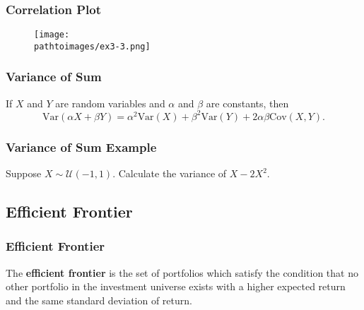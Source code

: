 \documentclass{beamer}
\newcommand{\pathtoimages}{/Users/charlesrambo/Desktop/Bootcamp24/Images}
\begin{document}
\begin{frame}[fragile]
\frametitle{Correlation Plot}
\begin{figure}
\centering
\texttt{[image: \\pathtoimages/ex3-3.png]}
\end{figure}

\end{frame}


\begin{frame}
\frametitle{Variance of Sum}

\begin{Theorem}
If $X$ and $Y$ are random variables and $\alpha$ and $\beta$ are constants, then
$$
\text{Var}(\alpha X + \beta Y) = \alpha^2 \text{Var}(X) + \beta^2\text{Var}(Y) + 2\alpha\beta \text{Cov}(X, Y).
$$
\end{Theorem}
\end{frame}

\begin{frame}[t]
\frametitle{Variance of Sum Example}
\begin{Example}
Suppose $X\sim{\mathcal{U}(-1, 1)}$. Calculate the variance of $X - 2 X^2$.
\end{Example}

\end{frame}

\subsection{Efficient Frontier}

\begin{frame}
\frametitle{Efficient Frontier}

\begin{Definition}
The {\bf efficient frontier} is the set of portfolios which satisfy the condition that no other portfolio in the investment universe exists with a higher expected return and the same standard deviation of return.
\end{Definition}
\begin{figure}
\centering
{}
\end{figure}
\end{frame}
\end{document}
